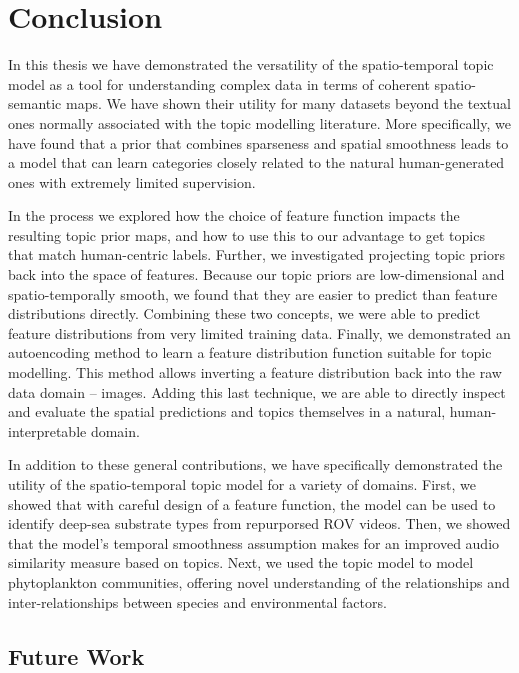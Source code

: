
\chapter{Conclusion}

In this thesis we have demonstrated the versatility of the spatio-temporal topic model as a tool for understanding complex data in terms of coherent spatio-semantic maps. We have shown their utility for many datasets beyond the textual ones normally associated with the topic modelling literature. More specifically, we have found that a prior that combines sparseness and spatial smoothness leads to a model that can learn categories closely related to the natural human-generated ones with extremely limited supervision.

In the process we explored how the choice of feature function impacts the resulting topic prior maps, and how to use this to our advantage to get topics that match human-centric labels. Further, we investigated projecting topic priors back into the space of features. Because our topic priors are low-dimensional and spatio-temporally smooth, we found that they are easier to predict than feature distributions directly. Combining these two concepts, we were able to predict feature distributions from very limited training data. Finally, we demonstrated an autoencoding method to learn a feature distribution function suitable for topic modelling. This method allows inverting a feature distribution back into the raw data domain -- images. Adding this last technique, we are able to directly inspect and evaluate the spatial predictions and topics themselves in a natural, human-interpretable domain.

In addition to these general contributions, we have specifically demonstrated the utility of the spatio-temporal topic model for a variety of domains. First, we showed that with careful design of a feature function, the model can be used to identify deep-sea substrate types from repurporsed ROV videos. Then, we showed that the model's temporal smoothness assumption makes for an improved audio similarity measure based on topics. Next, we used the topic model to model phytoplankton communities, offering novel understanding of the relationships and inter-relationships between species and environmental factors.

\section{Future Work}

